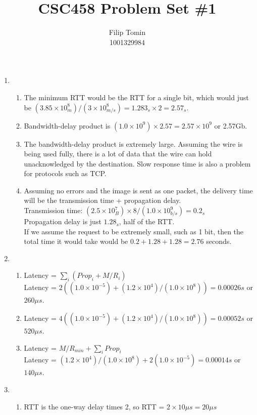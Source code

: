 \documentclass[12pt]{article}
\title{CSC458 Problem Set \#1\\}
\author{Filip Tomin\\
\normalsize{1001329984}}
\date{}
\begin{document}
\maketitle
\begin{enumerate}
\item %
\begin{enumerate}
\item %
The minimum RTT would be the RTT for a single bit, which would just be $(3.85\times 10^8_m) / (3\times 10^8_{m/s}) = 1.283_s\times 2 = 2.57_s$.
\item %
Bandwidth-delay product is $(1.0\times 10^9)\times 2.57 = 2.57\times 10^9$ or 2.57Gb.
\item %
The bandwidth-delay product is extremely large. Assuming the wire is being used fully, there is a lot of data that the wire can hold unacknowledged by the destination. Slow response time is also a problem for protocols such as TCP.
\item %
Assuming no errors and the image is sent as one packet, the delivery time will be the transmission time + propagation delay.\\
Transmission time: $(2.5\times 10^7_B)\times 8 / (1.0\times 10^9_{b/s}) = 0.2_s$\\
Propagation delay is just $1.28_s$, half of the RTT.\\
If we assume the request to be extremely small, such as 1 bit, then the total time it would take would be $0.2 + 1.28 + 1.28 = 2.76$ seconds.
\end{enumerate}
\item %
\begin{enumerate}
\item %
Latency = $\sum_i (Prop_i + M/R_i)$\\
Latency = $2((1.0\times 10^{-5}) + (1.2\times 10^4)/(1.0\times 10^8)) = 0.00026s$ or $260\mu s$.
\item %
Latency = $4((1.0\times 10^{-5}) + (1.2\times 10^4)/(1.0\times 10^8)) = 0.00052s$ or $520\mu s$.
\item %
Latency = $M/R_{min} + \sum_i Prop_i$\\
Latency = $(1.2\times 10^4)/(1.0\times 10^8) + 2(1.0\times 10^{-5}) = 0.00014s$ or $140\mu s$.
\end{enumerate}
\item %
\begin{enumerate}
\item %
RTT is the one-way delay times 2, so RTT = $2\times 10\mu s = 20\mu s$\\

\end{enumerate}
\end{enumerate}
\end{document}
